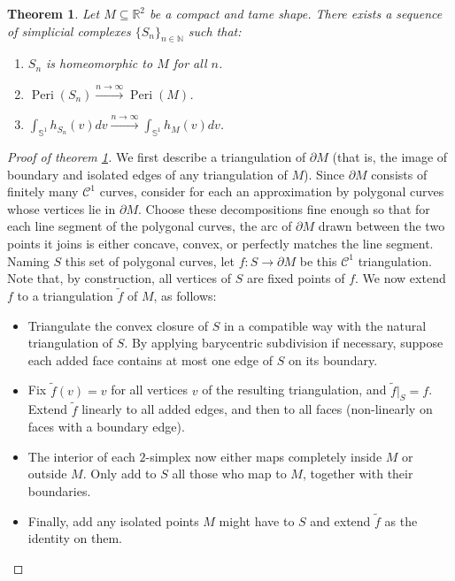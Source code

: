 \documentclass[10pt,a4paper]{amsart}
\newtheorem{theorem}{Theorem}
\newcommand{\Peri}{\operatorname{Peri}}
\newcommand{\bb}{\mathbb}
\begin{document}
\begin{theorem}
	\label{Approx}
	Let $M \subseteq \bb R^2$ be a compact and tame shape. There exists a sequence of simplicial complexes $\{S_n\}_{n \in \bb N}$ such that:
	
	\begin{enumerate}
		\item $S_n$ is homeomorphic to $M$ for all $n$.
		\item $\Peri(S_n) \overset{n \to \infty}{\longrightarrow} \Peri(M)$.
		\item $\int_{\bb S^{1}}h_{S_n}(v) dv \overset{n \to \infty}{\longrightarrow} \int_{\bb S^{1}} h_M(v) dv$.
	\end{enumerate}
\end{theorem}

\begin{proof}[Proof of theorem \ref{Approx}]
	We first describe a triangulation of $\partial M$ (that is, the image of boundary and isolated edges of any triangulation of $M$). Since $\partial M$ consists of finitely many $\mathcal C^1$ curves, consider for each an approximation by polygonal curves whose vertices lie in $\partial M$. Choose these decompositions fine enough so that for each line segment of the polygonal curves, the arc of $\partial M$ drawn between the two points it joins is either concave, convex, or perfectly matches the line segment. Naming $S$ this set of polygonal curves, let $f: S \to \partial M$ be this $\mathcal C^1$ triangulation. Note that, by construction, all vertices of $S$ are fixed points of $f$. We now extend $f$ to a triangulation $\tilde f$ of $M$, as follows:
	\begin{itemize}
		\item Triangulate the convex closure of $S$ in a compatible way with the natural triangulation of $S$. By applying barycentric subdivision if necessary, suppose each added face contains at most one edge of $S$ on its boundary.
		\item Fix $\tilde f(v) = v$ for all vertices $v$ of the resulting triangulation, and $\tilde f|_{S}=f$. Extend $\tilde f$ linearly to all added edges, and then to all faces (non-linearly on faces with a boundary edge).
		\item The interior of each $2$-simplex now either maps completely inside $M$ or outside $M$. Only add to $S$ all those who map to $M$, together with their boundaries.
		\item Finally, add any isolated points $M$ might have to $S$ and extend $\tilde f$ as the identity on them.
	\end{itemize}
	

\end{proof}
\end{document}

